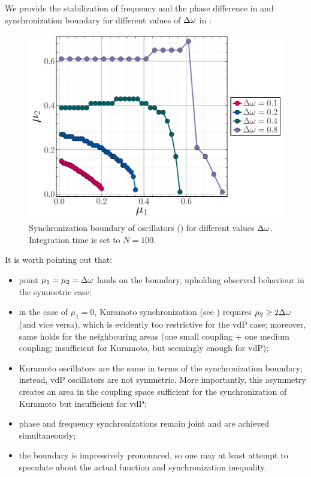 \documentclass{mynotes}
\begin{document}
We provide the stabilization of frequency and the phase difference in  and synchronization boundary for different values of \( \Delta\omega \) in : 
\begin{figure}[hbtp]
      \centering
      \includegraphics[width = 0.66\columnwidth]{figures/synch_boundary_2.pdf}
      \caption{
            Synchronization boundary of oscillators () for different values \( \Delta\omega \). Integration time is set to \( N = 100 \).
            \label{fig:synch_boundary}
      }
\end{figure}


It is worth pointing out that:
\begin{itemize}[ topsep = -0.5em, itemsep = -0.25em ]
      \item point \( \mu_1 = \mu_2 = \Delta\omega \) lands on the boundary, upholding observed behaviour in the symmetric case;
      \item in the case of \( \mu_1 = 0 \), Kuramoto synchronization (see ) requires \( \mu_2 \ge 2\Delta\omega \) (and vice versa), which is evidently too restrictive for the vdP case; moreover, same holds for the neighbouring areas (one small coupling + one medium coupling; insufficient for Kuramoto, but seemingly enough for vdP);
      \item Kuramoto oscillators are the same in terms of the synchronization boundary; instead, vdP oscillators are not symmetric. More importantly, this asymmetry creates an area in the coupling space sufficient for the synchronization of Kuramoto but insufficient for vdP;
      \item phase and frequency synchronizations remain joint and are achieved simultaneously;
      \item the boundary is impressively pronounced, so one may at least attempt to speculate about the actual function and synchronization inequality.
\end{itemize}
\end{document}
